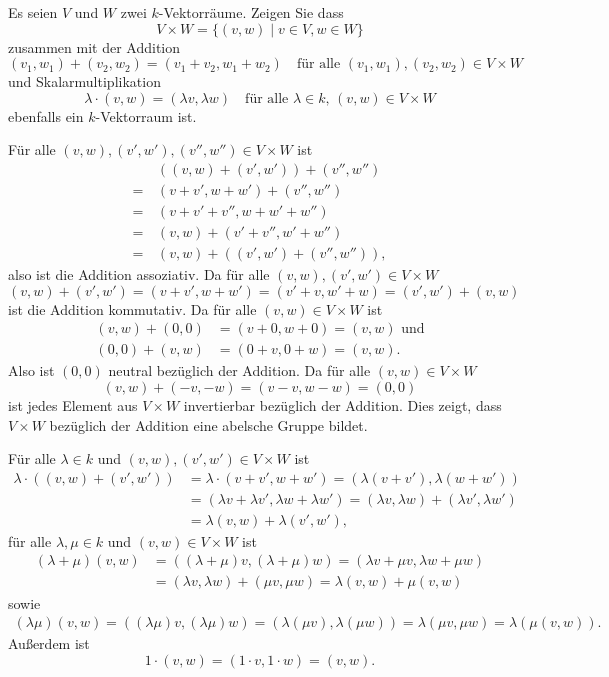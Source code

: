 \begin{question}
 Es seien $V$ und $W$ zwei $k$-Vektorräume. Zeigen Sie dass
 \[
  V \times W = \{(v,w) \mid v \in V, w \in W\}
 \]
 zusammen mit der Addition
 \[
  (v_1,w_1) + (v_2,w_2) = (v_1+v_2, w_1+w_2)
  \quad \text{für alle $(v_1, w_1), (v_2, w_2) \in V \times W$}
 \]
 und Skalarmultiplikation
 \[
  \lambda \cdot (v,w) = (\lambda v, \lambda w)
  \quad \text{für alle $\lambda \in k$, $(v,w) \in V \times W$}
 \]
 ebenfalls ein $k$-Vektorraum ist.
\end{question}
\begin{solution}
 Für alle $(v,w), (v',w'), (v'',w'') \in V \times W$ ist
 \begin{align*}
   &\, ((v, w) + (v', w')) + (v'', w'') \\
  =&\, (v + v', w + w') + (v'', w'') \\
  =&\, (v + v' + v'', w + w' + w'') \\
  =&\, (v, w) + (v' + v'', w' + w'') \\
  =&\, (v, w) + ((v', w') + (v'', w'')),
 \end{align*}
 also ist die Addition assoziativ. Da für alle $(v,w), (v',w') \in V \times W$
 \[
  (v, w) + (v', w') = (v + v', w + w') = (v' + v, w' + w) = (v', w') + (v, w)
 \]
 ist die Addition kommutativ. Da für alle $(v, w) \in V \times W$ ist
 \begin{align*}
  (v, w) + (0, 0) &= (v + 0, w + 0) = (v, w) \text{ und}\\
  (0, 0) + (v, w) &= (0 + v, 0 + w) = (v, w).
 \end{align*}
 Also ist $(0, 0)$ neutral bezüglich der Addition. Da für alle $(v, w) \in V \times W$
 \[
  (v, w) + (-v, -w) = (v-v, w-w) = (0, 0)
 \]
 ist jedes Element aus $V \times W$ invertierbar bezüglich der Addition. Dies zeigt, dass $V \times W$ bezüglich der Addition eine abelsche Gruppe bildet.
 
 Für alle $\lambda \in k$ und $(v, w), (v', w') \in V \times W$ ist
 \begin{align*}
  \lambda \cdot ((v, w) + (v', w'))
  &= \lambda \cdot (v + v', w + w')
  = (\lambda (v + v'), \lambda (w + w')) \\
  &= (\lambda v + \lambda v', \lambda w + \lambda w')
  = (\lambda v, \lambda w) + (\lambda v', \lambda w') \\
  &= \lambda (v, w) + \lambda (v', w'),
 \end{align*}
 für alle $\lambda, \mu \in k$ und $(v, w) \in V \times W$ ist
 \begin{align*}
  (\lambda + \mu) (v, w)
  &= ((\lambda + \mu) v, (\lambda + \mu) w)
  = (\lambda v + \mu v, \lambda w + \mu w) \\
  &= (\lambda v, \lambda w) + (\mu v, \mu w)
  = \lambda (v, w) + \mu (v, w)
 \end{align*}
 sowie
 \begin{align*}
  (\lambda \mu) (v, w)
  = ((\lambda \mu) v, (\lambda \mu) w)
  = (\lambda (\mu v), \lambda (\mu w))
  = \lambda (\mu v, \mu w)
  = \lambda (\mu (v, w)).
 \end{align*}
 Außerdem ist
 \[
  1 \cdot (v, w)
  = (1 \cdot v, 1 \cdot w)
  = (v, w).
 \]
 

\end{solution}
